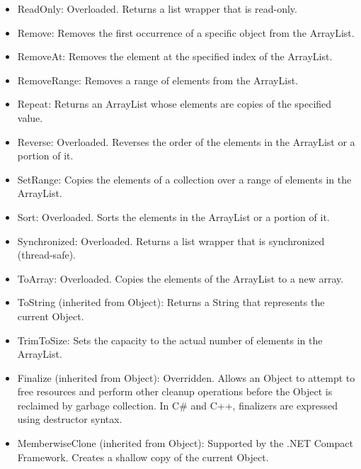 \documentclass[12pt,a4paper,final,twoside,titlepage]{book}
\begin{document}
\begin{itemize}
\item ReadOnly: Overloaded. Returns a list wrapper that is read-only.
\item Remove: Removes the first occurrence of a specific object from the ArrayList.
\item RemoveAt: Removes the element at the specified index of the ArrayList.
\item RemoveRange: Removes a range of elements from the ArrayList.
\item Repeat: Returns an ArrayList whose elements are copies of the specified value.
\item Reverse: Overloaded. Reverses the order of the elements in the ArrayList or a portion of it.
\item SetRange: Copies the elements of a collection over a range of elements in the ArrayList.
\item Sort: Overloaded. Sorts the elements in the ArrayList or a portion of it.
\item Synchronized: Overloaded. Returns a list wrapper that is synchronized (thread-safe).
\item ToArray: Overloaded. Copies the elements of the ArrayList to a new array.
\item ToString (inherited from Object): Returns a String that represents the current Object.
\item TrimToSize: Sets the capacity to the actual number of elements in the ArrayList.
\item Finalize (inherited from Object): Overridden. Allows an Object to attempt to free resources and perform other cleanup operations before the Object is reclaimed by garbage collection. In C\# and C++, finalizers are expressed using destructor syntax.
\item MemberwiseClone (inherited from Object): Supported by the .NET Compact Framework. Creates a shallow copy of the current Object.
\end{itemize}
\end{document}
